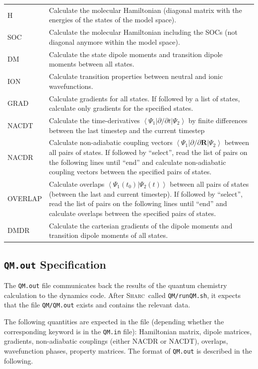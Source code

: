 \documentclass[a4paper,11pt,DIV=15,openany,twoside=false]{scrbook}
\newcommand{\sharc}{\textsc{Sharc}}
\newcommand{\ttt}[1]{\texttt{#1}}
\begin{document}
\begin{tabular}{lp{9cm}}
H               &Calculate the molecular Hamiltonian (diagonal matrix with the energies of the states of the model space).\\
SOC             &Calculate the molecular Hamiltonian including the SOCs (not diagonal anymore within the model space).\\
DM              &Calculate the state dipole moments and transition dipole moments between all states.\\
ION             &Calculate transition properties between neutral and ionic wavefunctions.\\
GRAD            &Calculate gradients for all states. If followed by a list of states, calculate only gradients for the specified states.\\
NACDT           &Calculate the time-derivatives $\left\langle\Psi_1|\partial/\partial t|\Psi_2\right\rangle$ by finite differences between the last timestep and the current timestep\\
NACDR           &Calculate non-adiabatic coupling vectors $\left\langle\Psi_1|\partial/\partial \mathbf{R}|\Psi_2\right\rangle$ between all pairs of states. If followed by ``select'', read the list of pairs on the following lines until ``end'' and calculate non-adiabatic coupling vectors between the specified pairs of states.\\
OVERLAP         &Calculate overlaps $\left\langle\Psi_1(t_0)|\Psi_2(t)\right\rangle$ between all pairs of states (between the last and current timestep). If followed by ``select'', read the list of pairs on the following lines until ``end'' and calculate overlaps between the specified pairs of states.\\
DMDR            &Calculate the cartesian gradients of the dipole moments and transition dipole moments of all states.\\
\end{tabular}

\subsection{\ttt{QM.out} Specification}\label{intf:qmout}

The \ttt{QM.out} file communicates back the results of the quantum chemistry calculation to the dynamics code. After \sharc\ called \ttt{QM/runQM.sh}, it expects that the file \ttt{QM/QM.out} exists and contains the relevant data.

The following quantities are expected in the file (depending whether the corresponding keyword is in the \ttt{QM.in} file): Hamiltonian matrix, dipole matrices, gradients, non-adiabatic couplings (either NACDR or NACDT), overlaps, wavefunction phases, property matrices. The format of \ttt{QM.out} is described in the following. 
\end{document}

